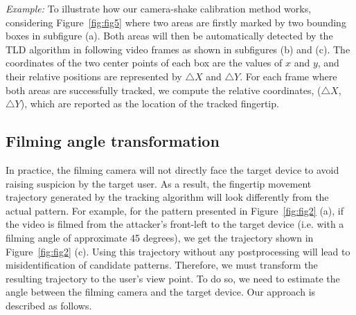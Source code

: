         \noindent \emph{Example:} To illustrate how our camera-shake calibration method  works, considering
        Figure~\ref{fig:fig5} where two areas are firstly marked by two
        bounding boxes in subfigure (a).
        Both areas will
        then be automatically detected by the TLD algorithm in following video
        frames as shown in subfigures (b) and (c).
        The coordinates of the two center points of each box are the values of $x$ and $y$, and their relative positions are represented by
        $\triangle X$ and $\triangle Y$.
        For each frame
        where both areas are successfully tracked, we
        compute the relative coordinates, ($\triangle X$, $\triangle Y$), which are reported as the location of the tracked fingertip.



\vspace{-3mm}
\subsection{Filming angle transformation}
\label{sec:transformation}
In practice, the filming camera will not directly face the target device to avoid raising suspicion by the target user. As a result, the
fingertip movement trajectory generated by the tracking
algorithm will look differently from the actual pattern. For example, for the
pattern presented in Figure~\ref{fig:fig2} (a), if the video is filmed from the attacker's front-left to the target device (i.e. with a filming angle of approximate 45 degrees),
we get the trajectory shown in Figure~\ref{fig:fig2} (c).
Using this trajectory without any postprocessing will lead to misidentification of candidate patterns.
Therefore, we must transform the resulting trajectory to the user's view point. To do so, we need to estimate the angle between the filming camera and the target device. Our approach is described as follows.

